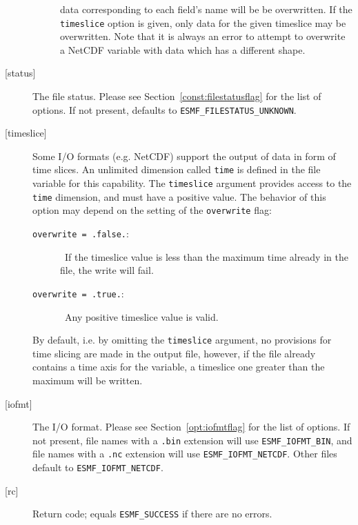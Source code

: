 \begin{description}
\begin{sloppypar}
\begin{description}
        data corresponding to each field's name will be
        be overwritten. If the {\tt timeslice} option is given, only data for
        the given timeslice may be overwritten.
        Note that it is always an error to attempt to overwrite a NetCDF
        variable with data which has a different shape.
      \end{description}
      \end{sloppypar}
     \item[{[status]}]
      \begin{sloppypar}
      The file status. Please see Section~\ref{const:filestatusflag} for
      the list of options. If not present, defaults to
      {\tt ESMF\_FILESTATUS\_UNKNOWN}.
      \end{sloppypar}
     \item[{[timeslice]}]
      \begin{sloppypar}
      Some I/O formats (e.g. NetCDF) support the output of data in form of
      time slices.  An unlimited dimension called {\tt time} is defined in the
      file variable for this capability.
      The {\tt timeslice} argument provides access to the {\tt time} dimension,
      and must have a positive value. The behavior of this
      option may depend on the setting of the {\tt overwrite} flag:
      \begin{description}
      \item[{\tt overwrite = .false.}:]\ If the timeslice value is
      less than the maximum time already in the file, the write will fail.
      \item[{\tt overwrite = .true.}:]\ Any positive timeslice value is valid.
      \end{description}
      By default, i.e. by omitting the {\tt timeslice} argument, no
      provisions for time slicing are made in the output file,
      however, if the file already contains a time axis for the variable,
      a timeslice one greater than the maximum will be written.
      \end{sloppypar}
     \item[{[iofmt]}]
       \begin{sloppypar}
      The I/O format.  Please see Section~\ref{opt:iofmtflag} for the list
      of options. If not present, file names with a {\tt .bin} extension will
      use {\tt ESMF\_IOFMT\_BIN}, and file names with a {\tt .nc} extension
      will use {\tt ESMF\_IOFMT\_NETCDF}.  Other files default to
      {\tt ESMF\_IOFMT\_NETCDF}.
       \end{sloppypar}
     \item [{[rc]}]
       Return code; equals {\tt ESMF\_SUCCESS} if there are no errors.
     \end{description}
  
\setlength{\parskip}{\oldparskip}
\setlength{\parindent}{\oldparindent}
\setlength{\baselineskip}{\oldbaselineskip}
